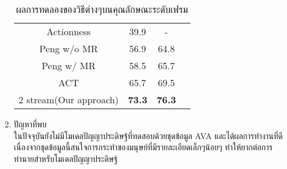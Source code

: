 \begin{enumerate}
\begin{enumerate}
\begin{table}[!ht]
\begin{tabular}{|c|c|c|c|}
					\hline
					Actionness 			& 39.9				& 	-						\\
					Peng w/o MR			& 56.9				& 64.8						\\
					Peng w/  MR 			& 58.5				& 65.7						\\
					ACT					& 65.7				& 69.5						\\
					\hline
					2 stream(Our approach)		& \textbf{73.3}		& \textbf{76.3}				\\
					\hline
				\end{tabular}
				\caption{ผลการทดลองของวิธีต่างๆบนคุณลักษณะระดับเฟรม}
				\label{tab: transfer learning}
			\end{table}
		\item ปัญหาที่พบ\\
		ในปัจจุบันยังไม่มีโมเดลปัญญาประดิษฐ์ที่ทดสอบด้วยชุดข้อมูล AVA และได้ผลการทำงานที่ดี เนื่องจากชุดข้อมูลนี้สนใจการกระทำของมนุษย์ที่มีรายละเอียดเล็กๆน้อยๆ 
		ทำให้ยากต่อการทำนายสำหรับโมเดลปัญญาประดิษฐ์
	\end{enumerate}
\end{enumerate}